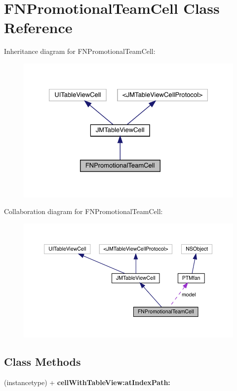 \hypertarget{interface_f_n_promotional_team_cell}{}\section{F\+N\+Promotional\+Team\+Cell Class Reference}
\label{interface_f_n_promotional_team_cell}


Inheritance diagram for F\+N\+Promotional\+Team\+Cell\+:\nopagebreak
\begin{figure}[H]
\begin{center}
\leavevmode
\includegraphics[width=326pt]{interface_f_n_promotional_team_cell__inherit__graph}
\end{center}
\end{figure}


Collaboration diagram for F\+N\+Promotional\+Team\+Cell\+:\nopagebreak
\begin{figure}[H]
\begin{center}
\leavevmode
\includegraphics[width=350pt]{interface_f_n_promotional_team_cell__coll__graph}
\end{center}
\end{figure}
\subsection*{Class Methods}
\begin{DoxyCompactItemize}
\item 
\mbox{\label{interface_f_n_promotional_team_cell_aaf915612d6f800cc9b9dd12766dc5d93}} 
(instancetype) + {\bfseries cell\+With\+Table\+View\+:at\+Index\+Path\+:}
\end{DoxyCompactItemize}
